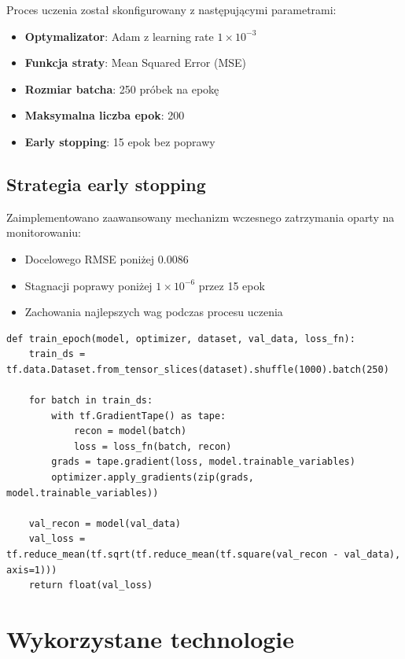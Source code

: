 \documentclass[12pt,a4paper]{article}
\begin{document}
Proces uczenia został skonfigurowany z następującymi parametrami:

\begin{itemize}
    \item \textbf{Optymalizator}: Adam z learning rate $1 \times 10^{-3}$
    \item \textbf{Funkcja straty}: Mean Squared Error (MSE)
    \item \textbf{Rozmiar batcha}: 250 próbek na epokę
    \item \textbf{Maksymalna liczba epok}: 200
    \item \textbf{Early stopping}: 15 epok bez poprawy
\end{itemize}

\subsection{Strategia early stopping}

Zaimplementowano zaawansowany mechanizm wczesnego zatrzymania oparty na monitorowaniu:
\begin{itemize}
    \item Docelowego RMSE poniżej 0.0086
    \item Stagnacji poprawy poniżej $1 \times 10^{-6}$ przez 15 epok
    \item Zachowania najlepszych wag podczas procesu uczenia
\end{itemize}

\begin{lstlisting}[caption=Fragment pętli treningowej z early stopping]
def train_epoch(model, optimizer, dataset, val_data, loss_fn):
    train_ds = tf.data.Dataset.from_tensor_slices(dataset).shuffle(1000).batch(250)
    
    for batch in train_ds:
        with tf.GradientTape() as tape:
            recon = model(batch)
            loss = loss_fn(batch, recon)
        grads = tape.gradient(loss, model.trainable_variables)
        optimizer.apply_gradients(zip(grads, model.trainable_variables))
    
    val_recon = model(val_data)
    val_loss = tf.reduce_mean(tf.sqrt(tf.reduce_mean(tf.square(val_recon - val_data), axis=1)))
    return float(val_loss)
\end{lstlisting}

\section{Wykorzystane technologie}
\end{document}
